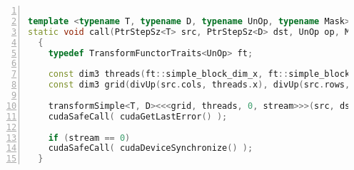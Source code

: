\documentclass[a4paper,10pt]{report}
\begin{document}
\begin{lstlisting}[frame=bt,title={aa},caption={gpu/include/opencv2/gpu/device/detail/transform\_detail.hpp},
columns=fullflexible,numbers=left,backgroundcolor=\color{LemonChiffon1},basicstyle=\footnotesize,keywordstyle=\ttfamily\footnotesize,language=C++,stringstyle=\ttfamily,breaklines=true,xleftmargin=0.5em,xrightmargin=0pt,aboveskip=\bigskipamount,belowskip=\bigskipamount]

template <typename T, typename D, typename UnOp, typename Mask>
static void call(PtrStepSz<T> src, PtrStepSz<D> dst, UnOp op, Mask mask, cudaStream_t stream)
  {
    typedef TransformFunctorTraits<UnOp> ft;

    const dim3 threads(ft::simple_block_dim_x, ft::simple_block_dim_y, 1);
    const dim3 grid(divUp(src.cols, threads.x), divUp(src.rows, threads.y), 1);

    transformSimple<T, D><<<grid, threads, 0, stream>>>(src, dst, mask, op);
    cudaSafeCall( cudaGetLastError() );

    if (stream == 0)
	cudaSafeCall( cudaDeviceSynchronize() );
  }
\end{lstlisting}








% 
% 
% 
\end{document}
